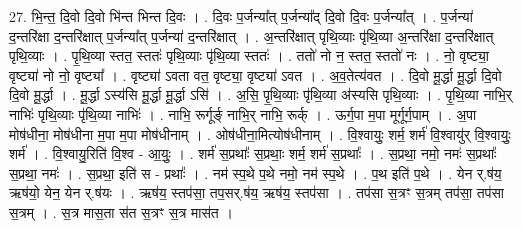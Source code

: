 \documentclass[17pt]{extarticle}
\begin{document}
27. भि॒न्त॒ दि॒वो दि॒वो भि॑न्त भिन्त दि॒वः । . दि॒वः प॒र्जन्या᳚त् प॒र्जन्या᳚द् दि॒वो दि॒वः प॒र्जन्या᳚त् । . प॒र्जन्या॑ द॒न्तरि॑क्षा द॒न्तरि॑क्षात् प॒र्जन्या᳚त् प॒र्जन्या॑ द॒न्तरि॑क्षात् । . अ॒न्तरि॑क्षात् पृथि॒व्याः पृ॑थि॒व्या अ॒न्तरि॑क्षा द॒न्तरि॑क्षात् पृथि॒व्याः । . पृ॒थि॒व्या स्तत॒ स्ततः॑ पृथि॒व्याः पृ॑थि॒व्या स्ततः॑ । . ततो॑ नो न॒ स्तत॒ स्ततो॑ नः । . नो॒ वृष्ट्या॒ वृष्ट्या॑ नो नो॒ वृष्ट्या᳚ । . वृष्ट्या॑ ऽवता वत॒ वृष्ट्या॒ वृष्ट्या॑ ऽवत । . अ॒व॒तेत्य॑वत । . दि॒वो मू॒र्द्धा मू॒र्द्धा दि॒वो दि॒वो मू॒र्द्धा । . मू॒र्द्धा ऽस्य॑सि मू॒र्द्धा मू॒र्द्धा ऽसि॑ । . अ॒सि॒ पृ॒थि॒व्याः पृ॑थि॒व्या अ॑स्यसि पृथि॒व्याः । . पृ॒थि॒व्या नाभि॒र् नाभिः॑ पृथि॒व्याः पृ॑थि॒व्या नाभिः॑ । . नाभि॒ रूर्गूर्ङ् नाभि॒र् नाभि॒ रूर्क् । . ऊर्ग॒पा म॒पा मूर्गूर्ग॒पाम् । . अ॒पा मोष॑धीना॒ मोष॑धीना म॒पा म॒पा मोष॑धीनाम् । . ओष॑धीना॒मित्योष॑धीनाम् । . वि॒श्वायुः॒ शर्म॒ शर्म॑ वि॒श्वायु॑र् वि॒श्वायुः॒ शर्म॑ । . वि॒श्वायु॒रिति॑ वि॒श्व - आ॒युः॒ । . शर्म॑ स॒प्रथाः᳚ स॒प्रथाः॒ शर्म॒ शर्म॑ स॒प्रथाः᳚ । . स॒प्रथा॒ नमो॒ नमः॑ स॒प्रथाः᳚ स॒प्रथा॒ नमः॑ । . स॒प्रथा॒ इति॑ स - प्रथाः᳚ । . नम॑ स्प॒थे प॒थे नमो॒ नम॑ स्प॒थे । . प॒थ इति॑ प॒थे । . येन र्.ष॑य॒ ऋष॑यो॒ येन॒ येन र्.ष॑यः । . ऋष॑य॒ स्तप॑सा॒ तप॒सर्.ष॑य॒ ऋष॑य॒ स्तप॑सा । . तप॑सा स॒त्रꣳ स॒त्रम् तप॑सा॒ तप॑सा स॒त्रम् । . स॒त्र मास॒ता स॑त स॒त्रꣳ स॒त्र मास॑त । \newline
\end{document}
